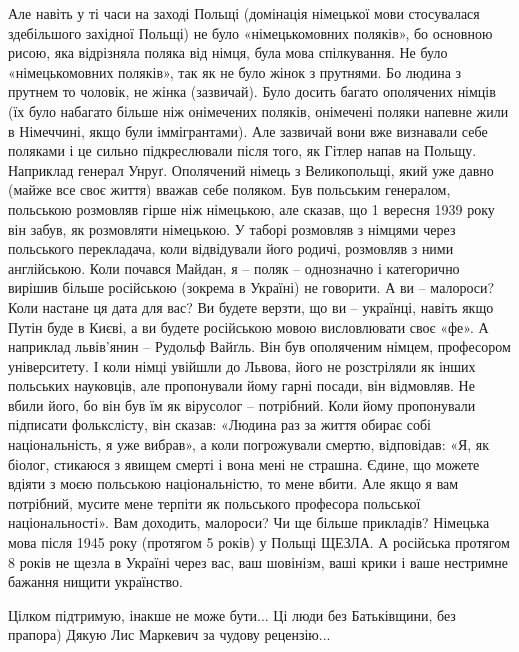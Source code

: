 Але навіть у ті часи на заході Польщі (домінація німецької мови стосувалася
здебільшого західної Польщі) не було «німецькомовних поляків», бо основною
рисою, яка відрізняла поляка від німця, була мова спілкування. Не було
«німецькомовних поляків», так як не було жінок з прутнями. Бо людина з прутнем
то чоловік, не жінка (зазвичай). Було досить багато ополячених німців (їх було
набагато більше ніж онімечених поляків, онімечені поляки напевне жили в
Німеччині, якщо були іммігрантами). Але зазвичай вони вже визнавали себе
поляками і це сильно підкреслювали після того, як Гітлер напав на Польщу.
Наприклад генерал Унруґ. Ополячений німець з Великопольщі, який уже давно
(майже все своє життя) вважав себе поляком. Був польським генералом, польською
розмовляв гірше ніж німецькою, але сказав, що 1 вересня 1939 року він забув, як
розмовляти німецькою. У таборі розмовляв з німцями через польського
перекладача, коли відвідували його родичі, розмовляв з ними англійською. Коли
почався Майдан, я – поляк – однозначно і категорично вирішив більше російською
(зокрема в Україні) не говорити. А ви – малороси? Коли настане ця дата для вас?
Ви будете верзти, що ви – українці, навіть якщо Путін буде в Києві, а ви будете
російською мовою висловлювати своє «фе». А наприклад львів’янин – Рудольф
Вайґль. Він був ополяченим німцем, професором університету. І коли німці
увійшли до Львова, його не розстріляли як інших польських науковців, але
пропонували йому гарні посади, він відмовляв. Не вбили його, бо він був їм як
вірусолог – потрібний. Коли йому пропонували підписати фолькслісту, він сказав:
«Людина раз за життя обирає собі національність, я уже вибрав», а коли
погрожували смертю, відповідав: «Я, як біолог, стикаюся з явищем смерті і вона
мені не страшна. Єдине, що можете вдіяти з моєю польською національністю, то
мене вбити. Але якщо я вам потрібний, мусите мене терпіти як польського
професора польської національності». Вам доходить, малороси? Чи ще більше
прикладів? Німецька мова після 1945 року (протягом 5 років) у Польщі ЩЕЗЛА. А
російська протягом 8 років не щезла в Україні через вас, ваш шовінізм, ваші
крики і ваше нестримне бажання нищити українство.

\begin{cmtfront}

Цілком підтримую, інакше не може бути... Ці люди без Батьківщини, без прапора)
Дякую Лис Маркевич за чудову рецензію...
\end{cmtfront}

